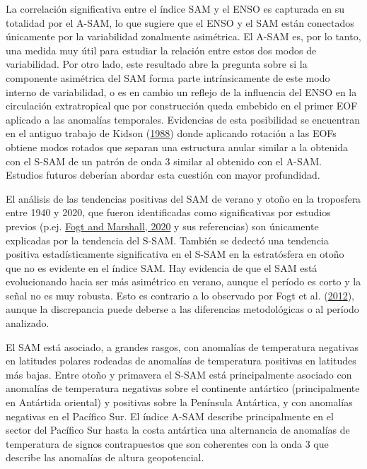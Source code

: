 \documentclass[12pt,oneside,a4paper]{reedthesis}
\begin{document}
La correlación significativa entre el índice SAM y el ENSO es capturada en su totalidad por el A-SAM, lo que sugiere que el ENSO y el SAM están conectados únicamente por la variabilidad zonalmente asimétrica.
El A-SAM es, por lo tanto, una medida muy útil para estudiar la relación entre estos dos modos de variabilidad.
Por otro lado, este resultado abre la pregunta sobre si la componente asimétrica del SAM forma parte intrínsicamente de este modo interno de variabilidad, o es en cambio un reflejo de la influencia del ENSO en la circulación extratropical que por construcción queda embebido en el primer EOF aplicado a las anomalías temporales.
Evidencias de esta posibilidad se encuentran en el antiguo trabajo de Kidson (\protect\hyperlink{ref-kidson1988}{1988}) donde aplicando rotación a las EOFs obtiene modos rotados que separan una estructura anular similar a la obtenida con el S-SAM de un patrón de onda 3 similar al obtenido con el A-SAM.
Estudios futuros deberían abordar esta cuestión con mayor profundidad.

El análisis de las tendencias positivas del SAM de verano y otoño en la troposfera entre 1940 y 2020, que fueron identificadas como significativas por estudios previos (p.ej. \protect\hyperlink{ref-fogt2020}{Fogt and Marshall, 2020} y sus referencias) son únicamente explicadas por la tendencia del S-SAM.
También se dedectó una tendencia positiva estadísticamente significativa en el S-SAM en la estratósfera en otoño que no es evidente en el índice SAM.
Hay evidencia de que el SAM está evolucionando hacia ser más asimétrico en verano, aunque el período es corto y la señal no es muy robusta.
Esto es contrario a lo observado por Fogt et al. (\protect\hyperlink{ref-fogt2012}{2012}), aunque la discrepancia puede deberse a las diferencias metodológicas o al período analizado.

El SAM está asociado, a grandes rasgos, con anomalías de temperatura negativas en latitudes polares rodeadas de anomalías de temperatura positivas en latitudes más bajas.
Entre otoño y primavera el S-SAM está principalmente asociado con anomalías de temperatura negativas sobre el continente antártico (principalmente en Antártida oriental) y positivas sobre la Península Antártica, y con anomalías negativas en el Pacífico Sur.
El índice A-SAM describe principalmente en el sector del Pacífico Sur hasta la costa antártica una alternancia de anomalías de temperatura de signos contrapuestos que son coherentes con la onda 3 que describe las anomalías de altura geopotencial.
\end{document}
